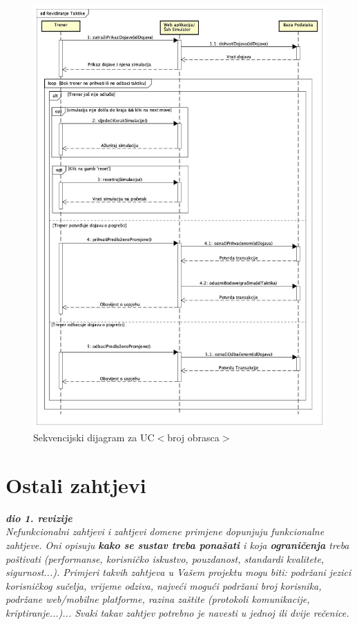 				
				\begin{figure}[H]
					\centerfloat
        					\includegraphics[scale=0.40]{dijagrami/RevidiranjeTaktike.jpg} %
        					\caption{Sekvencijski dijagram za UC$<$broj obrasca$>$}
        					\label{fig:UC$<$broj obrasca$>$}
				\end{figure}
				
				\eject
	
		\section{Ostali zahtjevi}
		
			\textbf{\textit{dio 1. revizije}}\\
			
			\textit{Nefunkcionalni zahtjevi i zahtjevi domene primjene dopunjuju funkcionalne zahtjeve. Oni opisuju \textbf{kako se sustav treba ponašati} i koja \textbf{ograničenja} treba poštivati (performanse, korisničko iskustvo, pouzdanost, standardi kvalitete, sigurnost...). Primjeri takvih zahtjeva u Vašem projektu mogu biti: podržani jezici korisničkog sučelja, vrijeme odziva, najveći mogući podržani broj korisnika, podržane web/mobilne platforme, razina zaštite (protokoli komunikacije, kriptiranje...)... Svaki takav zahtjev potrebno je navesti u jednoj ili dvije rečenice.}
			
